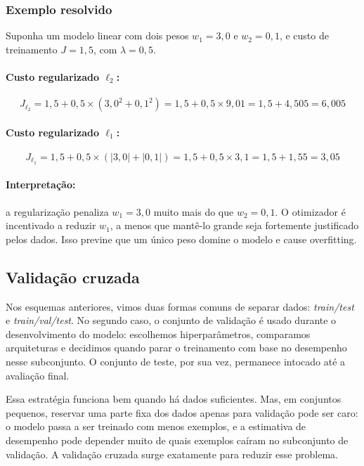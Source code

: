 \documentclass[12pt,a4paper]{article}
\begin{document}
\subsubsection{Exemplo resolvido}

Suponha um modelo linear com dois pesos $w_1 = 3{,}0$ e $w_2 = 0{,}1$, e custo de treinamento $J = 1{,}5$, com $\lambda = 0{,}5$.

\paragraph{Custo regularizado $\ell_2$:}
\[
J_{\ell_2} = 1{,}5 + 0{,}5 \times (3{,}0^2 + 0{,}1^2) = 1{,}5 + 0{,}5 \times 9{,}01 = 1{,}5 + 4{,}505 = 6{,}005
\]

\paragraph{Custo regularizado $\ell_1$:}
\[
J_{\ell_1} = 1{,}5 + 0{,}5 \times (|3{,}0| + |0{,}1|) = 1{,}5 + 0{,}5 \times 3{,}1 = 1{,}5 + 1{,}55 = 3{,}05
\]

\paragraph{Interpretação:} a regularização penaliza $w_1 = 3{,}0$ muito mais do que $w_2 = 0{,}1$. O otimizador é incentivado a reduzir $w_1$, a menos que mantê-lo grande seja fortemente justificado pelos dados. Isso previne que um único peso domine o modelo e cause overfitting.

\subsection{Validação cruzada}
\label{subsec:cross-val}

Nos esquemas anteriores, vimos duas formas comuns de separar dados: \emph{train/test} e \emph{train/val/test}. No segundo caso, o conjunto de validação é usado durante o desenvolvimento do modelo: escolhemos hiperparâmetros, comparamos arquiteturas e decidimos quando parar o treinamento com base no desempenho nesse subconjunto. O conjunto de teste, por sua vez, permanece intocado até a avaliação final.

Essa estratégia funciona bem quando há dados suficientes. Mas, em conjuntos pequenos, reservar uma parte fixa dos dados apenas para validação pode ser caro: o modelo passa a ser treinado com menos exemplos, e a estimativa de desempenho pode depender muito de quais exemplos caíram no subconjunto de validação. A validação cruzada surge exatamente para reduzir esse problema.
\end{document}
